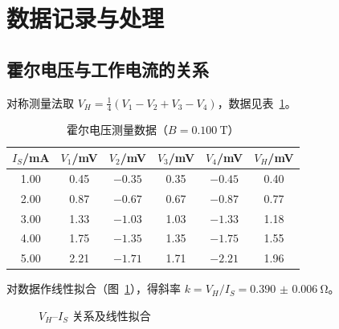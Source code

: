 \documentclass[boxed]{physlab}
\begin{document}
\section{数据记录与处理}
\subsection{霍尔电压与工作电流的关系}
对称测量法取 $V_H = \frac{1}{4}\left(V_1 - V_2 + V_3 - V_4\right)$，数据见表~\ref{tab:vh}。

\begin{table}[htbp]
  \centering
  \caption{霍尔电压测量数据（$B = \qty{0.100}{\tesla}$）}
  \label{tab:vh}
  \begin{tabular}{cccccc}
    \toprule
    $I_S$/\unit{\milli\ampere} & $V_1$/\unit{\milli\volt} & $V_2$/\unit{\milli\volt}
      & $V_3$/\unit{\milli\volt} & $V_4$/\unit{\milli\volt} & $V_H$/\unit{\milli\volt} \\
    \midrule
    1.00 & 0.45 & $-0.35$ & 0.35 & $-0.45$ & 0.40 \\
    2.00 & 0.87 & $-0.67$ & 0.67 & $-0.87$ & 0.77 \\
    3.00 & 1.33 & $-1.03$ & 1.03 & $-1.33$ & 1.18 \\
    4.00 & 1.75 & $-1.35$ & 1.35 & $-1.75$ & 1.55 \\
    5.00 & 2.21 & $-1.71$ & 1.71 & $-2.21$ & 1.96 \\
    \bottomrule
  \end{tabular}
\end{table}

对数据作线性拟合（图~\ref{fig:fit}），得斜率 $k = V_H / I_S = \qty{0.390(6)}{\ohm}$。

\begin{figure}[htbp]
  \centering
  \caption{$V_H$--$I_S$ 关系及线性拟合}
  \label{fig:fit}
\end{figure}
\end{document}
